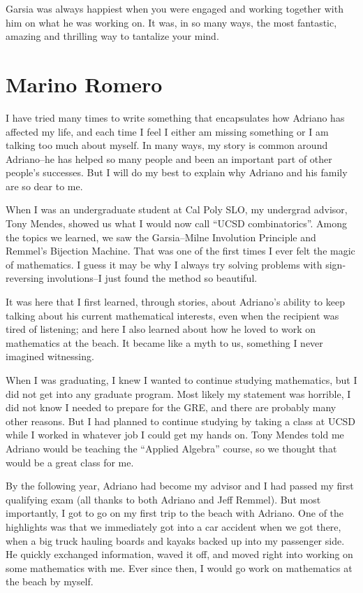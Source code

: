 \documentclass{amsart}
\begin{document}
Garsia was always happiest when you were engaged and working together with him on what he was working on.
It was, in so many ways, the most fantastic, amazing and thrilling way to tantalize your mind.

\section*{Marino Romero}

I have tried many times to write something that encapsulates how Adriano has affected my life, and each time I feel I either am missing something or I am talking too much about myself. In many ways, my story is common around Adriano--he has helped so many people and been an important part of other people's successes. But I will do my best to explain why Adriano and his family are so dear to me. 

When I was an undergraduate student at Cal Poly SLO, my undergrad advisor, Tony Mendes, showed us what I would now call ``UCSD combinatorics''. Among the topics we learned, we saw the Garsia--Milne Involution Principle and Remmel's Bijection Machine. That was one of the first times I ever felt the magic of mathematics. I guess it may be why I always try solving problems with sign-reversing involutions--I just found the method so beautiful.

It was here that I first learned, through stories, about Adriano's ability to keep talking about his current mathematical interests, even when the recipient was tired of listening; and here I also learned about how he loved to work on mathematics at the beach. It became like a myth to us, something I never imagined witnessing.

When I was graduating, I knew I wanted to continue studying mathematics, but I did not get into any graduate program. Most likely my statement was horrible, I did not know I needed to prepare for the GRE, and there are probably many other reasons. But I had planned to continue studying by taking a class at UCSD while I worked in whatever job I could get my hands on. Tony Mendes told me Adriano would be teaching the ``Applied Algebra'' course, so we thought that would be a great class for me.

By the following year, Adriano had become my advisor and I had passed my first qualifying exam (all thanks to both Adriano and Jeff Remmel). But most importantly, I got to go on my first trip to the beach with Adriano. One of the highlights was that we immediately got into a car accident when we got there, when a big truck hauling boards and kayaks backed up into my passenger side. He quickly exchanged information, waved it off, and moved right into working on some mathematics with me. Ever since then, I would go work on mathematics at the beach by myself. 
\end{document}
